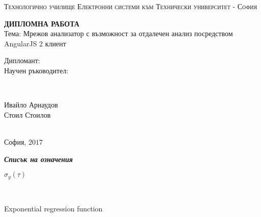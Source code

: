 \begin{titlepage}

\center %

\vspace{5mm}
\textsc{\Large Технологично училище Електронни системи към Технически
  университет - София}\\[0.5cm] %

\vspace{30mm}

{\Large \bfseries ДИПЛОМНА РАБОТА}\\[2cm]

\Large Тема: Мрежов анализатор с възможност за отдалечен анализ посредством
AngularJS 2 клиент

\vspace{40mm}

\begin{minipage}{0.35\textwidth}
\begin{flushright} \normalsize
Дипломант: \\[5mm]
Научен ръководител: \\[5mm]
\end{flushright}
\end{minipage}
~
\begin{minipage}{0.55\textwidth}
\begin{flushleft} \normalsize
Ивайло Арнаудов \\[5mm]
Стоил Стоилов\\[5mm]
\end{flushleft}
\end{minipage}\\[2cm]

{\normalsize София, $2017$} \\[0cm]


\vfill %


\newpage
\begin{flushleft}
\begin{Large}
\emph{\bf Списък на означения}\\
\end{Large}
\end{flushleft}
\begin{spacing}{1.241}
\vspace{10mm}
\begin{minipage}{0.2\textwidth}
\begin{flushleft} \normalsize
\ensuremath{\sigma_{y}(\tau)}\\
\end{flushleft}
\end{minipage}
~
\begin{minipage}{0.5\textwidth}
\begin{flushleft} \normalsize
Exponential regression function\\
\end{flushleft}
\end{minipage}\\[4cm]
\end{spacing}
\vfill


\end{titlepage}
